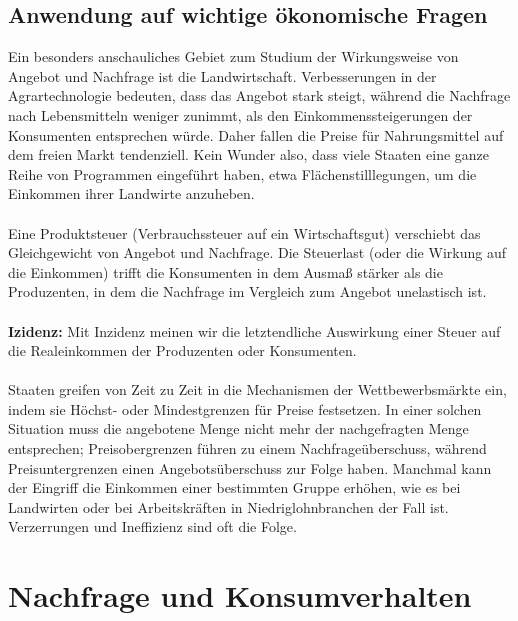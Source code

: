\documentclass[10pt]{scrartcl}
\begin{document}
\subsection{Anwendung auf wichtige ökonomische Fragen}
Ein besonders anschauliches Gebiet zum Studium der Wirkungsweise von Angebot und Nachfrage ist die Landwirtschaft. Verbesserungen in der Agrartechnologie bedeuten, dass das Angebot stark steigt, während die Nachfrage nach Lebensmitteln weniger zunimmt, als den Einkommenssteigerungen der Konsumenten entsprechen würde. Daher fallen die Preise für Nahrungsmittel auf dem freien Markt tendenziell. Kein Wunder also, dass viele Staaten eine ganze Reihe von Programmen eingeführt haben, etwa Flächenstilllegungen, um die Einkommen ihrer Landwirte anzuheben.
\\ \\ 
Eine Produktsteuer (Verbrauchssteuer auf ein Wirtschaftsgut) verschiebt das Gleichgewicht von Angebot und Nachfrage. Die Steuerlast (oder die Wirkung auf die Einkommen) trifft die  Konsumenten in dem Ausmaß stärker als die Produzenten, in dem die Nachfrage im Vergleich zum Angebot unelastisch ist.
\\ \\
{\bf Izidenz: }  Mit Inzidenz meinen wir die letztendliche Auswirkung einer Steuer auf die Realeinkommen der Produzenten oder Konsumenten. 
\\ \\
Staaten greifen von Zeit zu Zeit in die Mechanismen der Wettbewerbsmärkte ein, indem sie Höchst- oder Mindestgrenzen für Preise festsetzen. In einer solchen Situation muss die angebotene Menge nicht mehr  der nachgefragten Menge entsprechen; Preisobergrenzen führen zu einem Nachfrageüberschuss, während Preisuntergrenzen einen Angebotsüberschuss zur Folge haben. Manchmal kann der Eingriff die Einkommen einer bestimmten Gruppe erhöhen,  wie es bei Landwirten oder bei Arbeitskräften in Niedriglohnbranchen der Fall ist. Verzerrungen und Ineffizienz sind oft die Folge.
\section{Nachfrage und Konsumverhalten}
\end{document}
